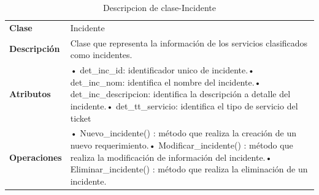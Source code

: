 \begin{table}[H]
	\centering
	\caption{Descripcion de clase-Incidente}
	\begin{tabular}{|p{6.145em}|p{28.07em}|}
		\toprule
		\rowcolor[rgb]{ .125,  .216,  .392} \multicolumn{2}{|p{34.215em}|}{\textcolor[rgb]{ 1,  1,  1}{\textbf{Clase  Incidente}}} \\
		\midrule
		\textbf{Clase} & \multicolumn{1}{l|}{Incidente} \\
		\midrule
		\textbf{Descripción} & Clase que representa la información de los servicios clasificados como incidentes. \\
		\midrule
		\textbf{Atributos } & •	det\_inc\_id: identificador unico de incidente.\newline{}•	det\_inc\_nom: identifica el nombre del incidente.\newline{}•	det\_inc\_descripcion: identifica la descripción a detalle del incidente.\newline{}•	det\_tt\_servicio: identifica el tipo de servicio del ticket  \\
		\midrule
		\textbf{Operaciones} & •	Nuevo\_incidente()   :  método que realiza la creación de un nuevo requerimiento.\newline{}•	Modificar\_incidente()  : método que  realiza la modificación de información del incidente.\newline{}•	Eliminar\_incidente() : método que realiza la eliminación de un incidente. \\
		\bottomrule
	\end{tabular}%
	\label{tab:CLAS10}%
\end{table}%



